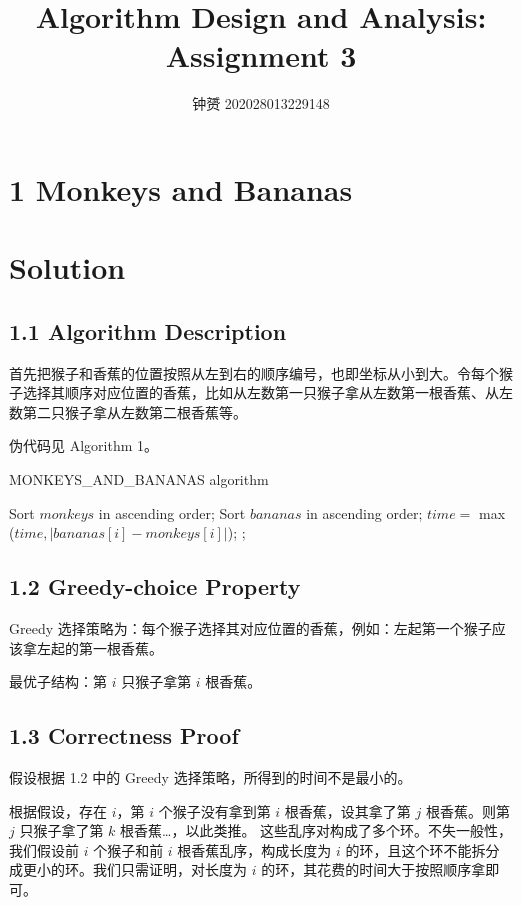 \documentclass[UTF8]{ctexart}
\title{Algorithm Design and Analysis: Assignment 3}
\author{钟赟 202028013229148}
\begin{document}
\maketitle
        
\section*{1 Monkeys and Bananas}

\section*{Solution}
\subsection*{1.1 Algorithm Description} 
首先把猴子和香蕉的位置按照从左到右的顺序编号，也即坐标从小到大。令每个猴子选择其顺序对应位置的香蕉，比如从左数第一只猴子拿从左数第一根香蕉、从左数第二只猴子拿从左数第二根香蕉等。

伪代码见 Algorithm 1。
\begin{algorithm}[h]
	\caption{MONKEYS\_AND\_BANANAS algorithm}
	\begin{algorithmic}[1]
		\State Sort $monkeys$ in ascending order; 
		\State Sort $bananas$ in ascending order; 
            \State $time = $ max ($time, \lvert bananas[i] - monkeys[i] \rvert$);
        \EndFor
		\State {} ;
		\EndFunction
	\end{algorithmic}
\end{algorithm}

\subsection*{1.2 Greedy-choice Property } 
Greedy 选择策略为：每个猴子选择其对应位置的香蕉，例如：左起第一个猴子应该拿左起的第一根香蕉。

最优子结构：第 $i$ 只猴子拿第 $i$ 根香蕉。
\subsection*{1.3 Correctness Proof } 
假设根据 1.2 中的 Greedy 选择策略，所得到的时间不是最小的。

根据假设，存在 $i$，第 $i$ 个猴子没有拿到第 $i$ 根香蕉，设其拿了第 $j$ 根香蕉。则第 $j$ 只猴子拿了第 $k$ 根香蕉\ldots，以此类推。
这些乱序对构成了多个环。不失一般性，我们假设前 $i$ 个猴子和前 $i$ 根香蕉乱序，构成长度为 $i$ 的环，且这个环不能拆分成更小的环。我们只需证明，对长度为 $i$ 的环，其花费的时间大于按照顺序拿即可。
\end{document}
